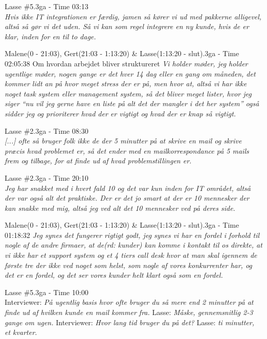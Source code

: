 \begin{thebibliography}{9}
	Lasse \#5.3ga - Time 03:13 \\
	\textit{Hvis ikke IT integrationen er færdig, jamen så kører vi ud med pakkerne alligevel, altså så gør vi det uden. Så vi kan som regel integrere en ny kunde, hvis de er klar, inden for en til to dage.}

	Malene(0 - 21:03), Gert(21:03 - 1:13:20) \& Lasse(1:13:20 - slut).3ga - Time 02:05:38
	Om hvordan arbejdet bliver struktureret \textit{Vi holder møder, jeg holder ugentlige møder, nogen gange er det hver 14 dag eller en gang om måneden, det kommer lidt an på hvor meget stress der er på, men hvor at, altså vi har ikke noget task system eller management system, så det bliver meget lister, hvor jeg siger “nu vil jeg gerne have en liste på alt det der mangler i det her system” også sidder jeg og prioriterer hvad der er vigtigt og hvad der er knap så vigtigt.}

	Lasse \#2.3ga - Time 08:30\\
	\textit{[...] ofte så bruger folk ikke de der 5 minutter på at skrive en mail og skrive præcis hvad problemet er, så det ender med en mailkorrespondance på 5 mails frem og tilbage, for at finde ud af hvad problemstillingen er.}

	Lasse \#2.3ga - Time 20:10\\
	\textit{Jeg har snakket med i hvert fald 10 og det var kun inden for IT området, altså der var også alt det praktiske. Der er det jo smart at der er 10 mennesker der kan snakke med mig, altså jeg ved alt det 10 mennesker ved på deres side.}

	Malene(0 - 21:03), Gert(21:03 - 1:13:20) \& Lasse(1:13:20 - slut).3ga - Time 01:18:32
	\textit{Jeg synes det fungerer rigtigt godt, jeg synes vi har en fordel i forhold til nogle af de andre firmaer, at de\emph{(rd: kunder)} kan komme i kontakt til os direkte, at vi ikke har et support system og et 4 tiers call desk hvor at man skal igennem de første tre der ikke ved noget som helst, som nogle af vores konkurrenter har, og det er en fordel, og det ser vores kunder helt klart også som en fordel.}

	Lasse \#5.3ga - Time 10:00 \\
	Interviewer: \textit{På ugentlig basis hvor ofte bruger du så mere end 2 minutter på at finde ud af hvilken kunde en mail kommer fra.} Lasse: \textit{Måske, gennemsnitlig 2-3 gange om ugen.} Interviewer: \textit{Hvor lang tid bruger du på det?} Lasse: \textit{ti minutter, et kvarter.}


\end{thebibliography}
